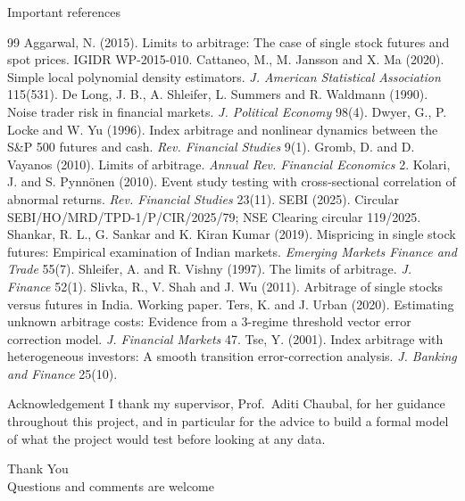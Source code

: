 \documentclass[11pt]{beamer}
\begin{document}
\begin{frame}[allowframebreaks]{Important references}
  \tiny
  \begin{thebibliography}{99}
     Aggarwal, N. (2015). Limits to arbitrage: The case of single stock futures and spot prices. IGIDR WP-2015-010.
     Cattaneo, M., M. Jansson and X. Ma (2020). Simple local polynomial density estimators. \emph{J. American Statistical Association} 115(531).
     De Long, J. B., A. Shleifer, L. Summers and R. Waldmann (1990). Noise trader risk in financial markets. \emph{J. Political Economy} 98(4).
     Dwyer, G., P. Locke and W. Yu (1996). Index arbitrage and nonlinear dynamics between the S\&P 500 futures and cash. \emph{Rev. Financial Studies} 9(1).
     Gromb, D. and D. Vayanos (2010). Limits of arbitrage. \emph{Annual Rev. Financial Economics} 2.
     Kolari, J. and S. Pynn\"onen (2010). Event study testing with cross-sectional correlation of abnormal returns. \emph{Rev. Financial Studies} 23(11).
     SEBI (2025). Circular SEBI/HO/MRD/TPD-1/P/CIR/2025/79; NSE Clearing circular 119/2025.
     Shankar, R. L., G. Sankar and K. Kiran Kumar (2019). Mispricing in single stock futures: Empirical examination of Indian markets. \emph{Emerging Markets Finance and Trade} 55(7).
     Shleifer, A. and R. Vishny (1997). The limits of arbitrage. \emph{J. Finance} 52(1).
     Slivka, R., V. Shah and J. Wu (2011). Arbitrage of single stocks versus futures in India. Working paper.
     Ters, K. and J. Urban (2020). Estimating unknown arbitrage costs: Evidence from a 3-regime threshold vector error correction model. \emph{J. Financial Markets} 47.
     Tse, Y. (2001). Index arbitrage with heterogeneous investors: A smooth transition error-correction analysis. \emph{J. Banking and Finance} 25(10).
  \end{thebibliography}
\end{frame}

\begin{frame}{Acknowledgement}
  I thank my supervisor, Prof.\ Aditi Chaubal, for her guidance throughout this project, and in particular for the
  advice to build a formal model of what the project would test before looking at any data.
\end{frame}

\begin{frame}
  \centering
  {\Huge\color{iitbblue} Thank You}\\[12pt]
  {\small Questions and comments are welcome}
\end{frame}
\end{document}
